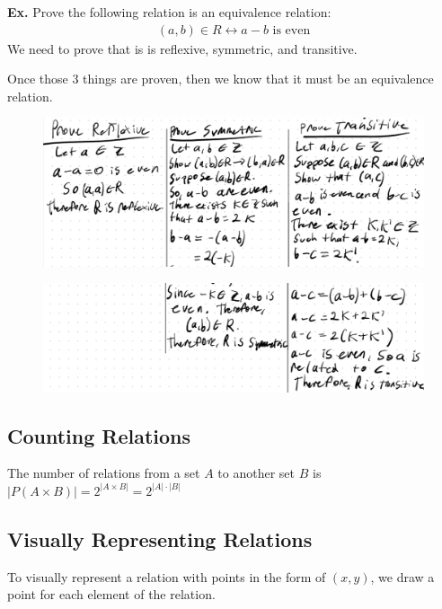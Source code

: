 \documentclass[12pt,letterpaper]{article} \usepackage{amsmath} \usepackage{graphicx}  \usepackage{longtable}  \usepackage{amssymb}
\begin{document}
        \begin{mdframed}
            \textbf{Ex.} Prove the following relation is an equivalence relation:
            \begin{align*}
                (a,b)\in R \leftrightarrow a-b \text{ is even}
            \end{align*}
            We need to prove that is is reflexive, symmetric, and transitive. 

            Once those 3 things are proven, then we know that it must be an equivalence relation. 

            \begin{figure}[H]
                \centering
                \includegraphics[width=0.9\linewidth]{prove-equi-1.png}
            \end{figure}

            \begin{figure}[H]
                \centering
                \includegraphics[width=0.9\linewidth]{prove-equi-2.png}
            \end{figure}

        \end{mdframed}

        \subsection{Counting Relations}
        The number of relations from a set $A$ to another set $B$ is $|P(A\times B)| = 2^{|A\times B|} = 2^{|A|\cdot|B|}$

        \subsection{Visually Representing Relations}
        To visually represent a relation with points in the form of $(x,y)$, we draw a point for each element of the relation. 
\end{document}
